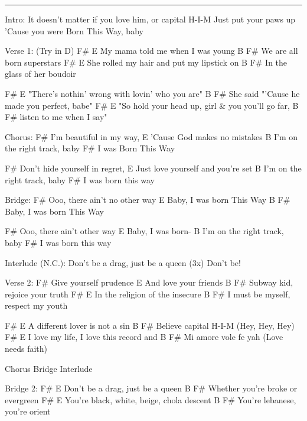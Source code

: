 \noindent\rule{\columnwidth}{1pt}

\begin{multicols}{2}
\begin{lstsong}
Intro:
It doesn't matter if you love him,
or capital H-I-M
Just put your paws up
'Cause you were Born This Way, baby

Verse 1: (Try in D)
F#                   E
My mama told me when I was young
B                    F#
We are all born superstars
F#                     E
She rolled my hair and put my lipstick on
B                      F#
In the glass of her boudoir

F#                           E
"There's nothin' wrong with lovin' who you are"
B           F#
She said "'Cause he made you perfect, babe"
F#                     E
"So hold your head up, girl & you you'll go far,
B                    F#
listen to me when I say"

Chorus:
    F#
I'm beautiful in my way,
       E
'Cause God makes no mistakes
           B
I'm on the right track, baby
      F#
I was Born This Way

           F#
Don't hide yourself in regret,
          E
Just love yourself and you're set
           B
I'm on the right track, baby
      F#
I was born this way
\end{lstsong}\vfill\columnbreak\begin{lstsong}
Bridge:
F#
Ooo, there ain't no other way
E
Baby, I was born This Way
B          F#
Baby, I was born This Way

F#
Ooo, there ain't other way
E
Baby, I was born-
           B
I'm on the right track, baby
      F#
I was born this way

Interlude (N.C.):
Don't be a drag, just be a queen (3x)
Don't be!

Verse 2:
F#
Give yourself prudence
E
And love your friends
B                        F#
Subway kid, rejoice your truth
F#                     E
In the religion of the insecure
          B                  F#
I must be myself, respect my youth

F#                   E
A different lover is not a sin
B                  F#
Believe capital H-I-M (Hey, Hey, Hey)
F#                 E
I love my life, I love this record and
B                F#
Mi amore vole fe yah (Love needs faith)

Chorus
Bridge
Interlude
\end{lstsong}\vfill\columnbreak\begin{lstsong}
Bridge 2:
      F#              E
Don't be a drag, just be a queen
   B                    F#
Whether you're broke or evergreen
       F#                   E
You're black, white, beige, chola descent
       B                  F#
You're lebanese, you're orient


\end{lstsong}
\end{multicols}
